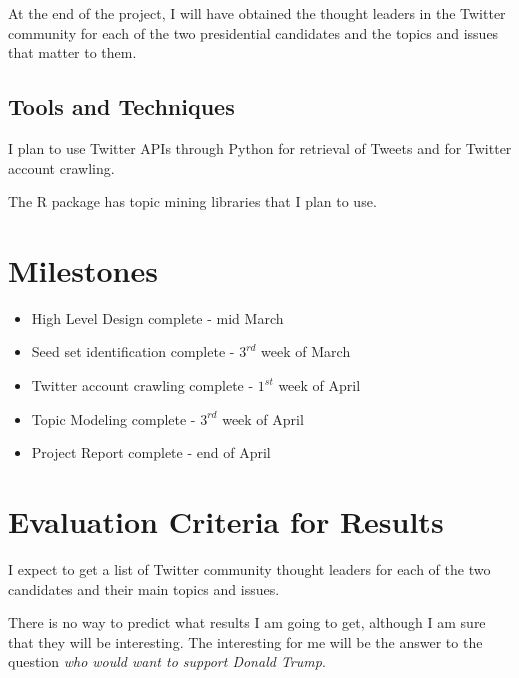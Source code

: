 \documentclass{sig-alternate-05-2015}
\begin{document}
At the end of the project, I will have obtained the thought leaders in the Twitter community for each of the two presidential candidates and the topics and issues that matter to them.

\subsection{Tools and Techniques}

I plan to use Twitter APIs through Python for retrieval of Tweets and for Twitter account crawling. 

The R package has topic mining libraries that I plan to use.

\section{Milestones}
\begin{itemize}
\item High Level Design complete - mid March
\item Seed set identification complete - $3^{rd}$ week of March
\item Twitter account crawling complete - $1^{st}$ week of April
\item Topic Modeling complete - $3^{rd}$ week of April
\item Project Report complete - end of April
\end{itemize}
\section{Evaluation Criteria for Results}

I expect to get a list of Twitter community thought leaders for each of the two candidates and their main topics and issues.

There is no way to predict what results I am going to get, although I am sure that they will be interesting. The interesting for me will be the answer to the question \emph{who would want to support Donald Trump}. 
\end{document}
